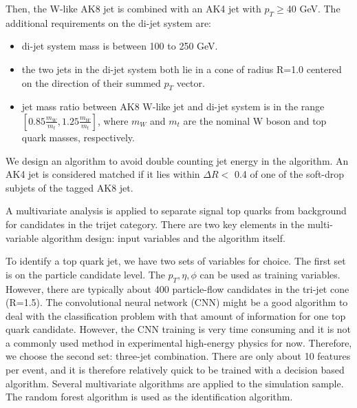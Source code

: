 Then, the W-like AK8 jet is combined with an AK4 jet with $p_{T}\ge$40 GeV. The additional requirements on the di-jet system are:
\begin{itemize}
\item di-jet system mass is between 100 to 250 GeV.
\item the two jets in the di-jet system both lie in a cone of radius R=1.0 centered on the direction of their summed $p_{T}$ vector.
\item jet mass ratio between AK8 W-like jet and di-jet system is in the range $[ 0.85 \frac{m_{W}}{m_{t}}, 1.25 \frac{m_{W}}{m_{t}} ]$, where $m_{W}$ and $m_{t}$ are the nominal W boson and top quark masses, respectively.
\end{itemize}

We design an algorithm to avoid double counting jet energy in the algorithm. An AK4 jet is considered matched if it lies within $\Delta R <$ 0.4 of one of the soft-drop subjets of the tagged AK8 jet.

A multivariate analysis is applied to separate signal top quarks from background for candidates in the trijet category. There are two key elements in the multi-variable algorithm design: input variables and the algorithm itself. 


To identify a top quark jet, we have two sets of variables for choice. The first set is on the particle candidate level. The $p_{T}, \eta, \phi$ can be used as training variables. However, there are typically about 400 particle-flow candidates in the tri-jet cone (R=1.5). The convolutional neural network\cite{NIPS2012_4824} (CNN) might be a good algorithm to deal with the classification problem with that amount of information for one top quark candidate. However, the CNN training is very time consuming and it is not a commonly used method in experimental high-energy physics for now. Therefore, we choose the second set: three-jet combination. There are only about 10 features per event, and it is therefore relatively quick to be trained with a decision based algorithm. Several multivariate algorithms are applied to the simulation sample. The random forest algorithm\cite{Ho:1995:RDF:844379.844681} is used as the identification algorithm.


